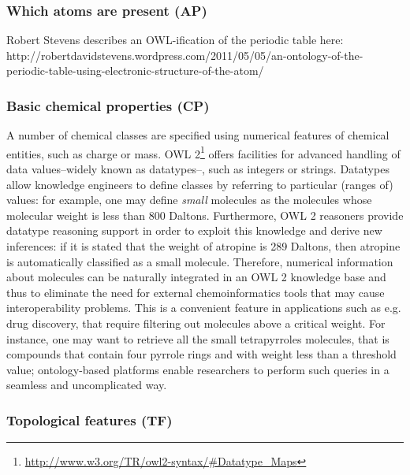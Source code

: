 \documentclass[10pt]{bmc_article}
\newenvironment{bmcformat}{\baselineskip20pt\sloppy\setboolean{publ}{false}}{\baselineskip20pt\sloppy}
\begin{document}
\begin{bmcformat}
\subsubsection*{Which atoms are present (AP)}

Robert Stevens describes an OWL-ification of the periodic table here: http://robertdavidstevens.wordpress.com/2011/05/05/an-ontology-of-the-periodic-table-using-electronic-structure-of-the-atom/

\subsubsection*{Basic chemical properties (CP)}

A number of chemical classes are specified using numerical features of chemical entities, such as charge or mass. OWL 2\footnote{\url{http://www.w3.org/TR/owl2-syntax/#Datatype_Maps}} offers facilities for advanced handling of data values--widely known as datatypes--, such as integers or strings. Datatypes allow knowledge engineers to define classes by referring to particular (ranges of) values: for example, one may define \emph{small} molecules as the molecules whose molecular weight is less than 800 Daltons. Furthermore, OWL 2 reasoners provide datatype reasoning support\cite{Motik2008} in order to exploit this knowledge and derive new inferences: if it is stated that the weight of atropine is 289 Daltons, then atropine is automatically classified as a small molecule. Therefore, numerical information about molecules can be naturally integrated in an OWL 2 knowledge base and thus to eliminate the need for external chemoinformatics tools that may cause interoperability problems. This is a convenient feature in applications such as e.g. drug discovery, that require filtering out molecules above a critical weight. For instance, one may want to retrieve all the small tetrapyrroles molecules, that is compounds that contain four pyrrole rings and with weight less than a threshold value; ontology-based platforms enable researchers to perform such queries in a seamless and uncomplicated way.

\subsubsection*{Topological features (TF)}
\label{subsubsec:cycles}


\end{bmcformat}
\end{document}
